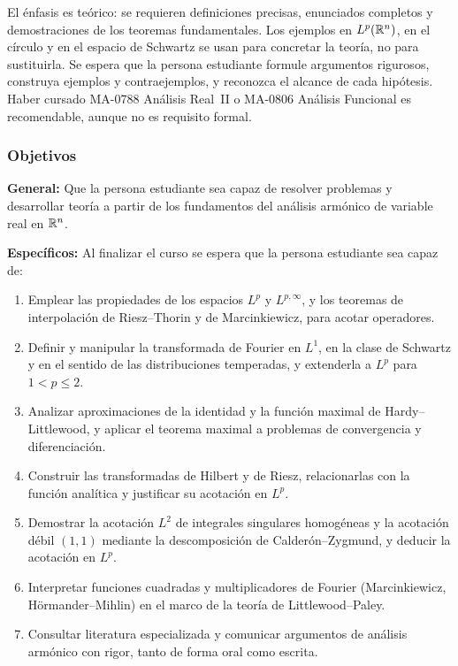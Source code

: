\begin{refsection}
El énfasis es teórico: se requieren definiciones precisas, enunciados completos y demostraciones de los teoremas fundamentales. Los ejemplos en $L^p(\mathbb{R}^n)$, en el círculo y en el espacio de Schwartz se usan para concretar la teoría, no para sustituirla. Se espera que la persona estudiante formule argumentos rigurosos, construya ejemplos y contraejemplos, y reconozca el alcance de cada hipótesis. Haber cursado MA-0788 Análisis Real~II o MA-0806 Análisis Funcional es recomendable, aunque no es requisito formal.

\subsubsection*{Objetivos}

\textbf{General:} Que la persona estudiante sea capaz de resolver problemas y desarrollar teoría a partir de los fundamentos del análisis armónico de variable real en $\mathbb{R}^n$.

\textbf{Específicos:} Al finalizar el curso se espera que la persona estudiante sea capaz de:

\begin{enumerate}
\item Emplear las propiedades de los espacios $L^p$ y $L^{p,\infty}$, y los teoremas de interpolación de Riesz--Thorin y de Marcinkiewicz, para acotar operadores.
\item Definir y manipular la transformada de Fourier en $L^1$, en la clase de Schwartz y en el sentido de las distribuciones temperadas, y extenderla a $L^p$ para $1<p\le 2$.
\item Analizar aproximaciones de la identidad y la función maximal de Hardy--Littlewood, y aplicar el teorema maximal a problemas de convergencia y diferenciación.
\item Construir las transformadas de Hilbert y de Riesz, relacionarlas con la función analítica y justificar su acotación en $L^p$.
\item Demostrar la acotación $L^2$ de integrales singulares homogéneas y la acotación débil $(1,1)$ mediante la descomposición de Calderón--Zygmund, y deducir la acotación en $L^p$.
\item Interpretar funciones cuadradas y multiplicadores de Fourier (Marcinkiewicz, Hörmander--Mihlin) en el marco de la teoría de Littlewood--Paley.
\item Consultar literatura especializada y comunicar argumentos de análisis armónico con rigor, tanto de forma oral como escrita.
\end{enumerate}


\end{refsection}

